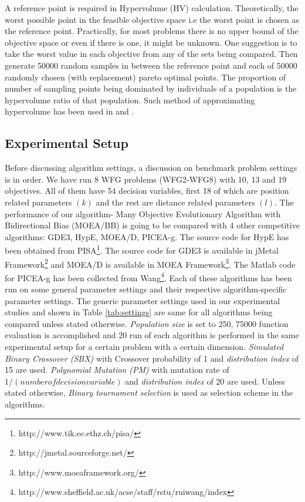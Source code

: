 \documentclass[journal]{IEEEtran}
\begin{document}
A reference point is required in Hypervolume (HV) calculation. Theoretically, the worst possible point in the feasible objective space i.e the worst point is chosen as the reference point. Practically, for most problems there is no upper bound of the objective space or even if there is one, it might be unknown. One suggestion is to take the worst value in each objective from any of the sets being compared. Then generate 50000 random samples in between the reference point and each of 50000 randomly chosen (with replacement) pareto optimal points. The proportion of number of sampling points being dominated by individuals of a population is the hypervolume ratio of that population. Such method of approximating hypervolume has been used in \cite{yang2013grid} and \cite{bader2011hype}.

\subsection{Experimental Setup}
\label{sec:exp:experimentalSetup}

Before discussing algorithm settings, a discussion on benchmark problem settings is in order. We have run 8 WFG problems (WFG2-WFG8) with 10, 13 and 19 objectives. All of them have 54 decision variables, first 18 of which are position related parameters $(k)$ and the rest are distance related parameters $(l)$. The performance of our algorithm- Many Objective Evolutionary Algorithm with Bidirectional Bias (MOEA/BB) is going to be compared with 4 other competitive algorithms: GDE3, HypE, MOEA/D, PICEA-g. The source code for HypE has been obtained from PISA\footnote{http://www.tik.ee.ethz.ch/pisa/}. The source code for GDE3 is available in jMetal Framework\footnote{http://jmetal.sourceforge.net/} and MOEA/D is available in MOEA Framework\footnote{http://www.moeaframework.org/}. The Matlab code for PICEA-g has been collected from Wang\footnote{http://www.sheffield.ac.uk/acse/staff/rstu/ruiwang/index}. Each of these algorithms has been run on some general parameter settings and their respective algorithm-specific parameter settings. The generic parameter settings used in our experimental studies and shown in Table \ref{tab:settings} are same for all algorithms being compared unless stated otherwise. \textit{Population size} is set to 250, 75000 function evaluation is accomplished and 20 run of each algorithm is performed in the same experimental setup for a certain problem with a certain dimension. \textit{Simulated Binary Crossover (SBX)} with Crossover probability of 1 and \textit{distribution index} of 15 are used. \textit{Polynomial Mutation (PM)} with mutation rate of $1/(number of decision variable)$ and \textit{distribution index} of 20 are used. Unless stated otherwise, \textit{Binary tournament selection} is used as selection scheme in the algorithms. 
\end{document}
